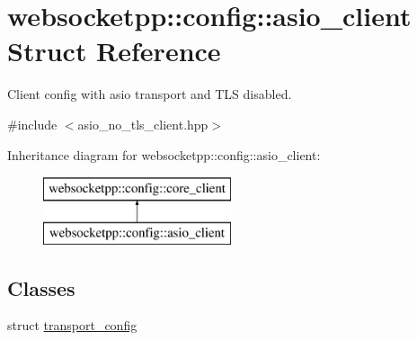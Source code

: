 \hypertarget{structwebsocketpp_1_1config_1_1asio__client}{}\section{websocketpp\+:\+:config\+:\+:asio\+\_\+client Struct Reference}
\label{structwebsocketpp_1_1config_1_1asio__client}


Client config with asio transport and T\+L\+S disabled.  




{\ttfamily \#include $<$asio\+\_\+no\+\_\+tls\+\_\+client.\+hpp$>$}

Inheritance diagram for websocketpp\+:\+:config\+:\+:asio\+\_\+client\+:\begin{figure}[H]
\begin{center}
\leavevmode
\includegraphics[height=2.000000cm]{structwebsocketpp_1_1config_1_1asio__client}
\end{center}
\end{figure}
\subsection*{Classes}
\begin{DoxyCompactItemize}
\item 
struct \hyperlink{structwebsocketpp_1_1config_1_1asio__client_1_1transport__config}{transport\+\_\+config}
\end{DoxyCompactItemize}
